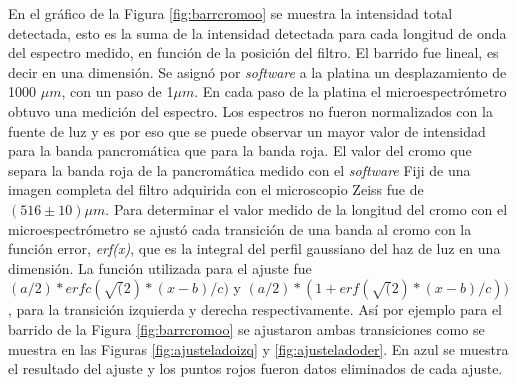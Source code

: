 En el gráfico de la Figura \ref{fig:barrcromoo} se muestra la intensidad total detectada, esto es la suma de la intensidad detectada para cada longitud de onda del espectro medido, en función de la posición del filtro. El barrido fue lineal, es decir en una dimensión. Se asignó por \textit{software} a la platina un desplazamiento de 1000 $\mu m$, con un paso de 1$\mu m$. En cada paso de la platina el microespectrómetro obtuvo una medición del espectro. Los espectros no fueron normalizados con la fuente de luz y es por eso que se puede observar un mayor valor de intensidad para la banda pancromática que para la banda roja. El valor del cromo que separa la banda roja de la pancromática medido con el \textit{software} Fiji de una imagen completa del filtro adquirida con el microscopio Zeiss fue de $( 516 \pm 10) \mu m$.
Para determinar el valor medido de la longitud del cromo con el microespectrómetro se ajustó cada transición de una banda al cromo con la función error, \textit{erf(x)}, que es la integral del perfil gaussiano del haz de luz en una dimensión. La función utilizada para el ajuste fue $(a/2)*erfc(\sqrt(2)*(x-b)/c)$ y $(a/2)*(1+erf(\sqrt(2)*(x-b)/c))$, para la transición izquierda y derecha respectivamente. Así por ejemplo para el barrido de la Figura \ref{fig:barrcromoo} se ajustaron ambas transiciones como se muestra en las Figuras \ref{fig:ajusteladoizq} y \ref{fig:ajusteladoder}. En azul se muestra el resultado del ajuste y los puntos rojos fueron datos eliminados de cada ajuste.
